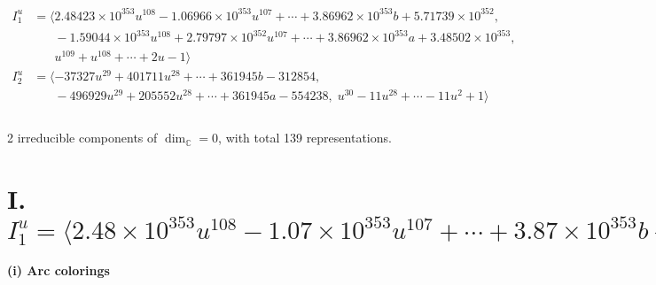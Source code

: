 \documentclass[1p]{elsarticle_modified}
\theoremstyle{definition}
\begin{document}
\begin{align*}
I^u_{1}&=\langle 
2.48423\times10^{353} u^{108}-1.06966\times10^{353} u^{107}+\cdots+3.86962\times10^{353} b+5.71739\times10^{352},\\
\phantom{I^u_{1}}&\phantom{= \langle  }-1.59044\times10^{353} u^{108}+2.79797\times10^{352} u^{107}+\cdots+3.86962\times10^{353} a+3.48502\times10^{353},\\
\phantom{I^u_{1}}&\phantom{= \langle  }u^{109}+u^{108}+\cdots+2 u-1\rangle \\
I^u_{2}&=\langle 
-37327 u^{29}+401711 u^{28}+\cdots+361945 b-312854,\\
\phantom{I^u_{2}}&\phantom{= \langle  }-496929 u^{29}+205552 u^{28}+\cdots+361945 a-554238,\;u^{30}-11 u^{28}+\cdots-11 u^2+1\rangle \\
\\
\end{align*}
\raggedright * 2 irreducible components of $\dim_{\mathbb{C}}=0$, with total 139 representations.\\
\newpage
\renewcommand{\arraystretch}{1}
\centering \section*{I. $I^u_{1}= \langle 2.48\times10^{353} u^{108}-1.07\times10^{353} u^{107}+\cdots+3.87\times10^{353} b+5.72\times10^{352},\;-1.59\times10^{353} u^{108}+2.80\times10^{352} u^{107}+\cdots+3.87\times10^{353} a+3.49\times10^{353},\;u^{109}+u^{108}+\cdots+2 u-1 \rangle$}
\flushleft \textbf{(i) Arc colorings}\\
\end{document}
